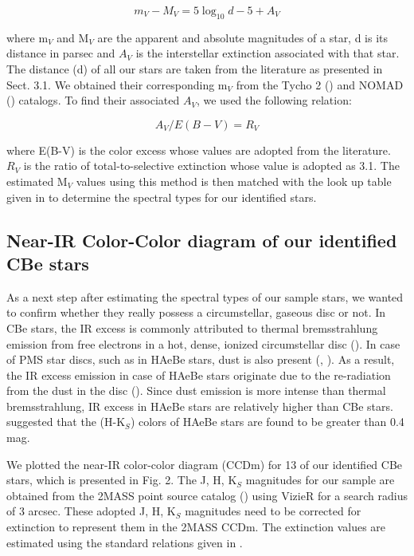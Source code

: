 \documentclass{jaa}
\begin{document}
\begin{equation*}
   m_{V} - M_{V} = 5 \log_{10} d - 5 + A_{V}
\end{equation*}

where m$_{V}$ and M$_{V}$ are the apparent and absolute magnitudes of a star, d is its distance in parsec and $A_{V}$ is the interstellar extinction associated with that star. The distance (d) of all our stars are taken from the literature as presented in Sect. 3.1. We obtained their corresponding m$_{V}$ from the Tycho 2 (\citealt{2000H}) and NOMAD (\citealt{2005Zacharias}) catalogs. To find their associated $A_{V}$, we used the following relation:

\begin{equation*}
  A_{V}/E(B-V) = R_{V}
\end{equation*}

where E(B-V) is the color excess whose values are adopted from the literature. $R_{V}$ is the ratio of total-to-selective extinction whose value is adopted as 3.1. The estimated M$_{V}$ values using this method is then matched with the look up table given in \cite{2013Pecaut} to determine the spectral types for our identified stars. 

\subsection{Near-IR Color-Color diagram of our identified CBe stars}
As a next step after estimating the spectral types of our sample stars, we wanted to confirm whether they really possess a circumstellar, gaseous disc or not. In CBe stars, the IR excess is commonly attributed to thermal bremsstrahlung emission from free electrons in a hot, dense, ionized circumstellar disc (\citealt{1974Gehrz,1977Hartmann}). In case of PMS star discs, such as in HAeBe stars, dust is also present (\citealt{1993Gorti, 1998WatersWaelkens}, \citealt{2019Arun}). As a result, the IR excess emission in case of HAeBe stars originate due to the re-radiation from the dust in the disc (\citealt{1992Hillenbrand}). Since dust emission is more intense than thermal bremsstrahlung, IR excess in HAeBe stars are relatively higher than CBe stars. \cite{1984Finkenzeller} suggested that the (H-K$_{S}$) colors of HAeBe stars are found to be greater than 0.4 mag.

We plotted the near-IR color-color diagram (CCDm) for 13 of our identified CBe stars, which is presented in Fig. 2. The J, H, K$_{S}$ magnitudes for our sample are obtained from the 2MASS point source catalog (\citealt{2003Cutri}) using VizieR for a search radius of 3 arcsec. These adopted J, H, K$_{S}$ magnitudes need to be corrected for extinction to represent them in the 2MASS CCDm. The extinction values are estimated using the standard relations given in \cite{1988Bessell}.
\end{document}
